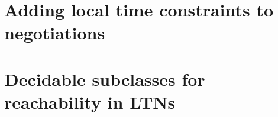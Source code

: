 \documentclass[oneside,12pt]{thesis}
\begin{document}
\maketitle
{}
\makedeclarationpage
\makecertificatepage
\makeacknowledgementpage
\tableofcontents
\clearpage
{}
\pagestyle{fancy}



\part{Adding local time constraints to negotiations}



\part{Decidable subclasses for reachability in LTNs}






\appendix



\end{document}
